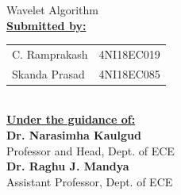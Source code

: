 \documentclass[a4paper,12pt]{report}
\begin{document}
\begin{titlepage}
\begin{center}
{        Wavelet Algorithm} \\
        \vspace{1cm}
        \textbf{\underline{\large Submitted by:}} \\
        \vspace{0.5cm}
        \begin{tabular}[H]{l l}
            C. Ramprakash & 4NI18EC019 \\
            Skanda Prasad & 4NI18EC085 \\
        \end{tabular}
        \\
        \vspace{1cm}
        \textbf{\underline{\large Under the guidance of:}} \\
        \vspace{0.5cm}
        \textbf{\large Dr. Narasimha Kaulgud} \\
        Professor and Head, Dept. of ECE \\
        \textbf{\large Dr. Raghu J. Mandya} \\
        Assistant Professor, Dept. of ECE \\
    \end{center}
\end{titlepage}
\clearpage
\restoregeometry


\newpage
\tableofcontents
\newpage

\listoffigures
\listoftables
\listoflistings
\newpage






\printbibliography
\end{document}
